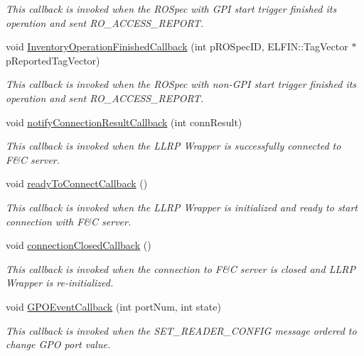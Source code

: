\begin{DoxyCompactItemize}
\begin{DoxyCompactList}\small\item\em This callback is invoked when the R\-O\-Spec with G\-P\-I start trigger finished its operation and sent R\-O\-\_\-\-A\-C\-C\-E\-S\-S\-\_\-\-R\-E\-P\-O\-R\-T. \end{DoxyCompactList}\item 
void \hyperlink{class_reader_app_ae90a98ed653ffa829a7dd3ddff98244b}{Inventory\-Operation\-Finished\-Callback} (int p\-R\-O\-Spec\-I\-D, E\-L\-F\-I\-N\-::\-Tag\-Vector $\ast$p\-Reported\-Tag\-Vector)
\begin{DoxyCompactList}\small\item\em This callback is invoked when the R\-O\-Spec with non-\/\-G\-P\-I start trigger finished its operation and sent R\-O\-\_\-\-A\-C\-C\-E\-S\-S\-\_\-\-R\-E\-P\-O\-R\-T. \end{DoxyCompactList}\item 
void \hyperlink{class_reader_app_a8a2cc18b3a9e771032e763ac170957a2}{notify\-Connection\-Result\-Callback} (int conn\-Result)
\begin{DoxyCompactList}\small\item\em This callback is invoked when the L\-L\-R\-P Wrapper is successfully connected to F\&C server. \end{DoxyCompactList}\item 
void \hyperlink{class_reader_app_a05825232b6db23daff3ffc5e59be2043}{ready\-To\-Connect\-Callback} ()
\begin{DoxyCompactList}\small\item\em This callback is invoked when the L\-L\-R\-P Wrapper is initialized and ready to start connection with F\&C server. \end{DoxyCompactList}\item 
void \hyperlink{class_reader_app_ac6971b9bead2c6f631fbac1c654faa1c}{connection\-Closed\-Callback} ()
\begin{DoxyCompactList}\small\item\em This callback is invoked when the connection to F\&C server is closed and L\-L\-R\-P Wrapper is re-\/initialized. \end{DoxyCompactList}\item 
void \hyperlink{class_reader_app_a8ec4922b19ffc8db003380f7ee3a5fb5}{G\-P\-O\-Event\-Callback} (int port\-Num, int state)
\begin{DoxyCompactList}\small\item\em This callback is invoked when the S\-E\-T\-\_\-\-R\-E\-A\-D\-E\-R\-\_\-\-C\-O\-N\-F\-I\-G message ordered to change G\-P\-O port value. \end{DoxyCompactList}\end{DoxyCompactItemize}
